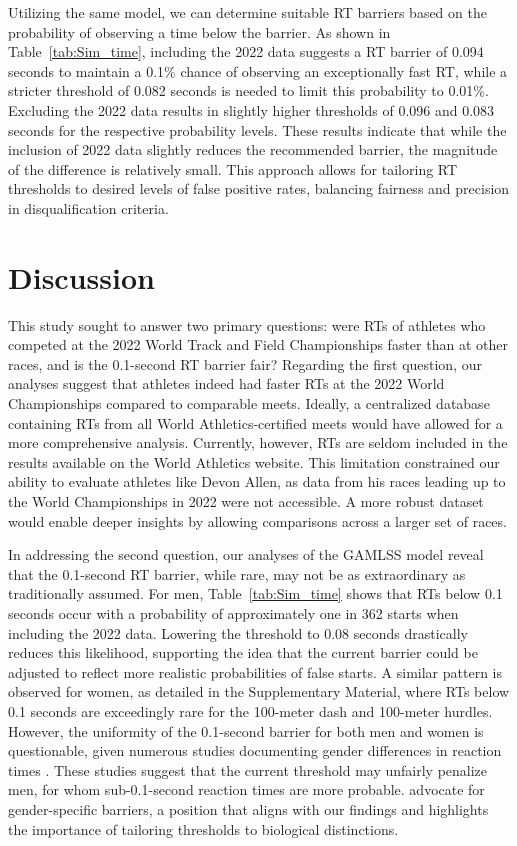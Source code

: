 \documentclass[12pt, letterpaper]{article}
\begin{document}
Utilizing the same model, we can determine suitable RT barriers
based on the probability of observing a time below the barrier. As shown in
Table~\ref{tab:Sim_time}, including the 2022 data suggests a RT
barrier of 0.094 seconds to maintain a 0.1\% chance of observing an
exceptionally fast RT, while a stricter threshold of 0.082 seconds
is needed to limit this probability to 0.01\%. Excluding the 2022 data results
in slightly higher thresholds of 0.096 and 0.083 seconds for the respective
probability levels. These results indicate that while the inclusion of 2022
data slightly reduces the recommended barrier, the magnitude of the difference
is relatively small. This approach allows for tailoring RT
thresholds to desired levels of false positive rates, balancing fairness and
precision in disqualification criteria.




\section{Discussion}\label{sec:concludingremarks}


This study sought to answer two primary questions: were RTs of athletes who
competed at the 2022 World Track and Field Championships faster than
at other races, and is the 0.1-second RT barrier fair?
Regarding the first question, our analyses suggest that athletes
indeed had faster RTs at the 2022 World Championships compared to comparable
meets. Ideally, a centralized database containing RTs from
all World Athletics-certified meets would have allowed for a more
comprehensive analysis. Currently, however, RTs are seldom
included in the results available on the World Athletics website. This
limitation constrained our ability to evaluate athletes like Devon
Allen, as data from his races leading up to the World Championships in
2022 were not accessible. A more robust dataset would enable deeper
insights by allowing comparisons across a larger set of races.


In addressing the second question, our analyses of the GAMLSS model
reveal that the 0.1-second RT barrier, while rare, may not
be as extraordinary  as traditionally assumed. For men,
Table~\ref{tab:Sim_time} shows that RTs below 0.1 seconds
occur with a probability of approximately one in 362 starts  when
including the 2022 data. Lowering the threshold to 0.08 seconds
drastically  reduces this likelihood, supporting the idea that the
current barrier could be adjusted to reflect more realistic
probabilities of false starts. A similar pattern is observed for
women, as detailed in the Supplementary Material, where RTs
 below 0.1 seconds are exceedingly rare for the 100-meter dash
and 100-meter  hurdles. However, the uniformity of the 0.1-second
barrier for both men and women  is questionable, given numerous
studies documenting gender differences in reaction  times
\citep[e.g.,][]{lipps2011implications, babicc2009reaction,
  panoutsakopoulos2020gender}. These studies suggest that the current
threshold may  unfairly penalize men, for whom sub-0.1-second reaction
times are more probable. \citet{brosnan2017effects} advocate for
gender-specific barriers, a position that  aligns with our findings
and highlights the importance of tailoring thresholds to biological
distinctions.
\end{document}
